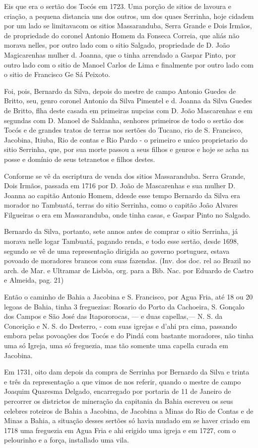  Eis  que era o sertão dos Tocós em 1723. Uma porção de sitios de lavoura e criação, a pequena distancia uns dos outros, um dos quaes Serrinha, hoje cidadem por um lado se limitavacom os sitios Massaranduba, Serra Grande e Dois Irmãos, de propriedade do coronel Antonio Homem da Fonseca Correia, que aliás não morava nelles, por outro lado com o sitio
 Salgado, propriedade de D. João Magicarenhas
 mulher d. Joanna, que o tinha arrendado a Gaspar Pinto, por outro lado com o sitio de Manoel Carlos de Lima e finalmente por outro lado com o sitio de Francisco Ge Sá Peixoto.
 
 Foi, pois, Bernardo da Silva, depois do mestre de campo Antonio Guedes de Britto, seu, genro coronel Antonio da Silva Pimentel e d. Joanna da Silva Guedes de Britto, flha deste casada
 em primeiras nupcias com D. João Mascarenhas e em segundas com D. Manoel de Saldanha, senhores primeiros de todo o sertão dos Tocós e de grandes tratos de terras nos sertões do Tucano, rio de S. Francisco, Jacobina, Itiuba, Rio de contas e Rio Pardo -  o primeiro e unico proprietario do sitio Serrinha, que, por sua
 morte passou a seus filhos e genros e hoje se acha na posse e domínio de seus tetranetos e filhos destes.
 
 Conforme se vê da escriptura de venda dos sitios Massaranduba. Serra Grande, Dois Irmãos, passada em 1716 por D. João de Mascarenhas e sua mulher D. Joanna ao capitão Antonio Homem, ddesde esse tempo Bernardo da Silva era morador no Tambuatá, terras do sitio Serrinha, como o capitão João Alvares Filgueiras o era em Massaranduba, onde tinha casas, e Gaspar Pinto no Salgado.
 
 Bernardo da Silva, portanto, sete annos antes de comprar o sitio Serrinha, já morava nelle logar Tambuatá, pagando renda,
 e todo esse sertão, desde 1698, segundo se vê de uma representação dirigida ao governo portuguez, estava povoado de moradores brancos com suas fazendas. (Inv. dos doc. rel ao Brazil no arch. de Mar. e Ultramar de Lisbõa, org. para a Bib. Nac. por Eduardo de Castro e Almeida, pag. 21)
 
 Então o caminho de Bahia a Jacobina e S. Francisco, por Agua Fria, até 18 ou 20 legoas de Bahia, tinha 3 freguezias: Rosario do Porto da Cachoeira, S. Gonçalo dos Campos e São José das Itapororocas, — e duas capellas,— N. S. da Conceição e N. S. do Desterro, - com suas igrejas e d'ahi pra cima, passando embora pelas povoações dos Tocós e do Pindá com bastante moradores, não tinha uma só Igreja, uma só freguezia, mas tão somente uma capella curada em Jacobina.
 
 Em 1731, oito dam depois da compra de Serrinha por Bernardo da Silva e trinta e três da representação a que vimos de nos referir, quando o mestre de campo Joaquim Quaresma Delgado, encarregado por portaria de 11 de Janeiro de percorrer os districtos de mineração da capitania da Bahia escreveu os seus celebres roteiros de Bahia a Jacobina, de Jacobina a Minas do Rio de Contas e de Minas a Bahia, a situação desses sertões só havia mudado em se haver criado em 1718 uma freguezia em
 Agua Fria e ahi erigido uma igreja e em 1727, com o pelourinho e a força, installado uma vila.
